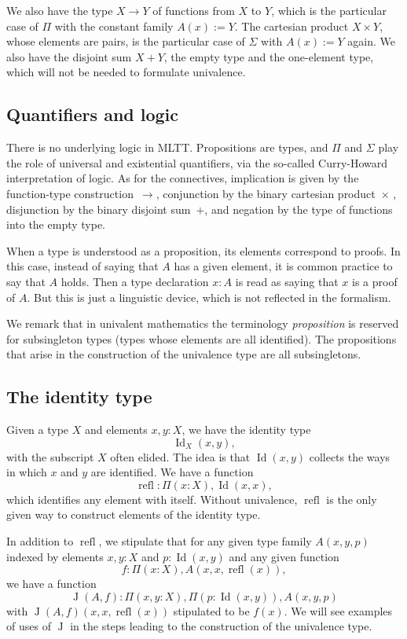 \documentclass{article}
\newcommand{\Id}{\operatorname{Id}}
\newcommand{\J}{\operatorname{J}}
\newcommand{\refl}{\operatorname{refl}}
\begin{document}
We also have the type $X\to Y$ of functions from $X$ to $Y$, which is
the particular case of $\Pi$ with the constant family $A(x):=Y$.  The
cartesian product $X\times Y$, whose elements are pairs, is the
particular case of $\Sigma$ with $A(x):=Y$ again.
We also have the disjoint sum $X+Y$, the empty type and the
one-element type, which will not be needed to formulate univalence.


\subsection{Quantifiers and logic}

There is no underlying logic in MLTT. Propositions are types, and
$\Pi$ and $\Sigma$ play the role of universal and existential
quantifiers, via the so-called Curry-Howard interpretation of
logic. As for the connectives, implication is given by the
function-type construction~$\to$, conjunction by the binary cartesian
product~$\times$ , disjunction by the binary disjoint sum~$+$, and
negation by the type of functions into the empty type.

When a type is understood as a proposition, its elements correspond to
proofs.  In this case, instead of saying that $A$ has a given element,
it is common practice to say that $A$ holds. Then a type declaration
$x:A$ is read as saying that $x$ is a proof of $A$. But this is just a
linguistic device, which is not reflected in the formalism.

We remark that in univalent mathematics the terminology
\emph{proposition} is reserved for subsingleton types (types whose
elements are all identified). The propositions that arise in the
construction of the univalence type are all subsingletons.

\subsection{The identity type}

Given a type $X$ and elements $x,y:X$, we have the identity type
\[
    \Id_X(x,y),
\]
with the subscript $X$ often elided. The idea is that $\Id(x,y)$ collects
the ways in which $x$ and $y$ are identified.
%
We have a function
\[
    \refl : \Pi(x:X), \Id(x,x),
\]
which identifies any element with itself. Without univalence, $\refl$ is
the only given way to construct elements of the identity type.

In addition to $\refl$, we stipulate that for any given type family $A(x,y,p)$
indexed by elements $x,y:X$ and $p:\Id(x,y)$ and any given function
\[
    f : \Pi(x:X), A(x,x,\refl(x)),
\]
we have a function 
\[
 \J(A,f) :  \Pi(x,y:X), \Pi(p:\Id(x,y)), A(x,y,p)
\]  
with $\J(A,f)(x,x,\refl(x))$ stipulated to be $f(x)$.  
We will see examples of uses of $\J$ in the steps leading to the
construction of the univalence type.
\end{document}
